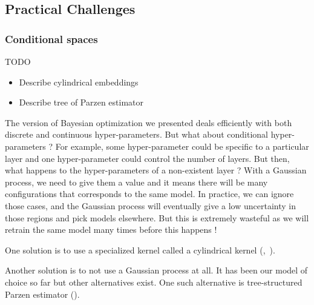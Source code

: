 

\subsection{Practical Challenges}
\label{ssec:practical}


\subsubsection{Conditional spaces}

TODO
\begin{itemize}
    \item Describe cylindrical embeddings
    \item Describe tree of Parzen estimator
\end{itemize}

The version of Bayesian optimization we presented deals efficiently with both discrete and continuous hyper-parameters. But what about conditional hyper-parameters ? For example, some hyper-parameter could be specific to a particular layer and one hyper-parameter could control the number of layers. But then, what happens to the hyper-parameters of a non-existent layer ? With a Gaussian process, we need to give them a value and it means there will be many configurations that corresponds to the same model. In practice, we can ignore those cases, and the Gaussian process will eventually give a low uncertainty in those regions and pick models elsewhere. But this is extremely wasteful as we will retrain the same model many times before this happens ! 

One solution is to use a specialized kernel called a cylindrical kernel (\textcite{swersky2013},~\textcite{oh2018}).

Another solution is to not use a Gaussian process at all. It has been our model of choice so far but other alternatives exist. One such alternative is tree-structured Parzen estimator (\textcite{bergstra2011NIPS}).

